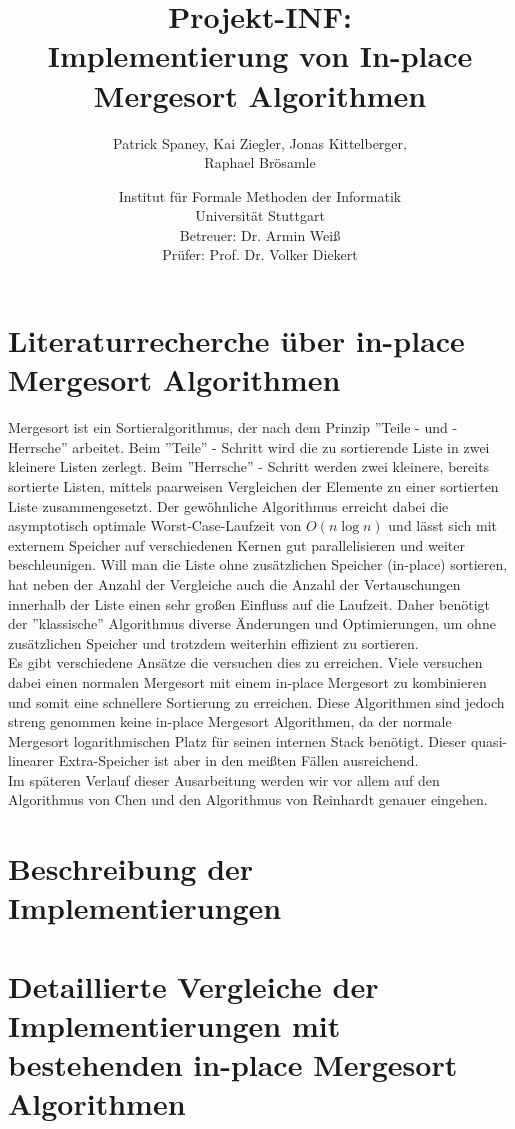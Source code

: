 \documentclass[12pt,pdftex,a4paper]{article}
\begin{document}
\title{Projekt-INF:\\
Implementierung von In-place Mergesort Algorithmen}
\author{Patrick Spaney, Kai Ziegler, Jonas Kittelberger, \\ Raphael Brösamle}
\date{Institut für Formale Methoden der Informatik \\ Universität Stuttgart\\
\normalsize Betreuer: Dr. Armin Weiß\\
Prüfer: Prof. Dr. Volker Diekert}
\maketitle
\section*{Literaturrecherche \"uber in-place Mergesort Algorithmen}

Mergesort ist ein Sortieralgorithmus, der nach dem Prinzip ''Teile - und - Herrsche'' arbeitet. Beim ''Teile'' - Schritt wird die zu
sortierende Liste in zwei kleinere Listen zerlegt. Beim ''Herrsche'' - Schritt werden zwei kleinere, bereits sortierte Listen,
mittels paarweisen Vergleichen der Elemente zu einer sortierten Liste zusammengesetzt.
Der gewöhnliche Algorithmus erreicht dabei die asymptotisch optimale Worst-Case-Laufzeit von $O(n \log n)$ und
lässt sich mit externem Speicher auf verschiedenen Kernen gut parallelisieren und weiter beschleunigen.
Will man die Liste ohne zusätzlichen Speicher (in-place) sortieren, hat neben der Anzahl der Vergleiche
auch die Anzahl der Vertauschungen innerhalb der Liste einen sehr großen Einfluss auf die Laufzeit.
Daher benötigt der ''klassische'' Algorithmus diverse Änderungen und Optimierungen, um ohne
zusätzlichen Speicher und trotzdem weiterhin effizient zu sortieren. \\
Es gibt verschiedene Ans\"atze die versuchen dies zu erreichen. Viele versuchen dabei einen normalen Mergesort mit einem in-place Mergesort zu kombinieren und somit eine schnellere Sortierung zu erreichen. Diese Algorithmen sind jedoch streng genommen keine in-place Mergesort Algorithmen, da der normale Mergesort logarithmischen Platz f\"ur seinen internen Stack ben\"otigt. Dieser quasi-linearer Extra-Speicher ist aber in den mei{\ss}ten F\"allen ausreichend. \\
Im sp\"ateren Verlauf dieser Ausarbeitung werden wir vor allem auf den Algorithmus von Chen\cite{Chen06} und den Algorithmus von Reinhardt\cite{Reinhardt92} genauer eingehen. 

\section*{Beschreibung der Implementierungen}

\section*{Detaillierte Vergleiche der Implementierungen mit bestehenden in-place Mergesort Algorithmen}

	

\end{document}
